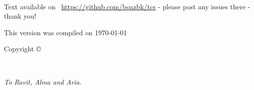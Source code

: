 \frontmatter


\maketitle



\newpage
\begin{fullwidth}
~\vfill
\thispagestyle{empty}
\setlength{\parindent}{0pt}
\setlength{\parskip}{\baselineskip}

Text available on \faGithub\  \url{https://github.com/boazbk/tcs} - please post any issues there - thank you!

This version was compiled on \today\ \currenttime

Copyright \copyright\ \the\year\ \thanklessauthor

\doclicenseThis



\end{fullwidth}



\cleardoublepage
\thispagestyle{empty}%
~\vfill
\begin{doublespace}
\noindent\fontsize{18}{22}\selectfont\itshape
\nohyphenation
To Ravit, Alma and Aria.
\end{doublespace}
\vfill
\vfill








\cleardoublepage

\setcounter{tocdepth}{1}
\setcounter{secnumdepth}{3}


\cleardoublepage
\setcounter{tocdepth}{3}
\tableofcontents


\cleardoublepage
